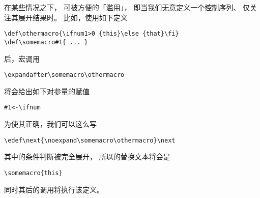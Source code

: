\documentclass{book}
\begin{document}
在某些情况之下，
可被方便的「滥用」，
即当我们无意定义一个控制序列、
仅关注其展开结果时。
比如，使用如下定义
\alt
\begin{verbatim}
\def\othermacro{\ifnum1>0 {this}\else {that}\fi}
\def\somemacro#1{ ... }
\end{verbatim}
后，宏调用
\begin{verbatim}
\expandafter\somemacro\othermacro 
\end{verbatim}
将会给出如下对参量的赋值
\begin{verbatim}
#1<-\ifnum
\end{verbatim}
为使其正确，我们可以这么写
\begin{verbatim}
\edef\next{\noexpand\somemacro\othermacro}\next
\end{verbatim}
其中的条件判断被完全展开，
所以的替换文本将会是
\begin{verbatim}
\somemacro{this}
\end{verbatim} 
同时其后的调用将执行该定义。


\end{document}
